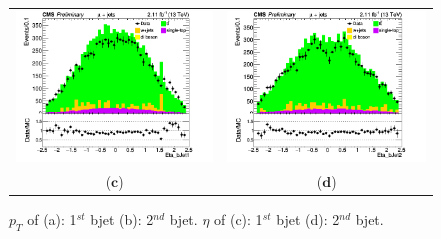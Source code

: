 \documentclass{cmspaper}
\begin{document}
\begin{figure}[htp]
\begin{tabular}{cc}
\includegraphics[scale=0.40]{results/Eta_bJet1.png}
& \hspace{-0.5cm} \includegraphics[scale=0.40]{results/Eta_bJet2.png}\\
   ($\mathbf{c}$)\qquad\qquad&($\mathbf{d}$)\qquad\qquad\qquad\\
\end{tabular}
\caption{$p_{T}$ of (a): 1$^{st}$ bjet (b): 2$^{nd}$ bjet. $\eta$ of (c): 1$^{st}$ bjet (d): 2$^{nd}$ bjet.}\label{Pts_etas_bjets}
\end{figure}
\end{document}
